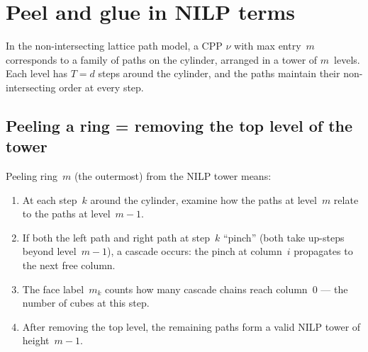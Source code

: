 \documentclass[11pt]{article}
\theoremstyle{plain}
\theoremstyle{definition}
\begin{document}
\section{Peel and glue in NILP terms}
\label{sec:nilp}

In the non-intersecting lattice path model, a CPP $\nu$ with max
entry~$m$ corresponds to a family of paths on the cylinder, arranged
in a tower of $m$~levels.  Each level has $T = d$ steps around the
cylinder, and the paths maintain their non-intersecting order at
every step.

\subsection{Peeling a ring = removing the top level of the tower}

Peeling ring~$m$ (the outermost) from the NILP tower means:
\begin{enumerate}
  \item At each step~$k$ around the cylinder, examine how the paths
    at level~$m$ relate to the paths at level~$m-1$.
  \item If both the left path and right path at step~$k$ ``pinch''
    (both take up-steps beyond level~$m-1$), a cascade occurs:
    the pinch at column~$i$ propagates to the next free column.
  \item The face label~$m_k$ counts how many cascade chains reach
    column~$0$ --- the number of cubes at this step.
  \item After removing the top level, the remaining paths form a
    valid NILP tower of height~$m-1$.
\end{enumerate}

\begin{center}
\end{center}
\end{document}
